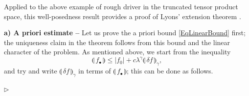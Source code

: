 \documentclass[11pt,a4paper]{amsart}
\renewcommand{\leq}{\leqslant}
\numberwithin{equation}{section} %
\newenvironment{Dem}{%
    \begin{list}{\hspace{0.5cm}{\sc Proof --}}{%
        \setlength{\topsep}{0pt}%
        \setlength{\leftmargin}{0pt}%
        \setlength{\rightmargin}{0pt}%
        \setlength{\listparindent}{0pt}%
        \setlength{\itemindent}{0pt}%
        \setlength{\parsep}{0pt}%
        \addtolength{\leftmargin}{20pt}%
        \addtolength{\rightmargin}{0pt}%
    } \item }{\hfill{\space $\rhd$}\end{list}\smallskip}
\begin{document}
\medskip

Applied to the above example of rough driver in the truncated tensor product space, this well-posedness result provides a proof of Lyons' extension theorem \cite{Lyons98}.

\medskip

\begin{Dem}
{\bf a) A priori estimate --} Let us prove the a priori bound \eqref{EqLinearBound} first; the uniqueness claim in the theorem follows from this bound and the linear character of the problem. As mentioned above, we start from the inequality
$$
\llparenthesis\,f_\bullet \,\rrparenthesis \leq | f_0 | + c \lambda^\gamma \llparenthesis\, \delta f \,\rrparenthesis _\gamma,
$$
and try and write $\llparenthesis\, \delta f \,\rrparenthesis _\gamma$ in terms of $\llparenthesis\,f_\bullet \,\rrparenthesis$; this can be done as follows.


\end{Dem}
\end{document}
